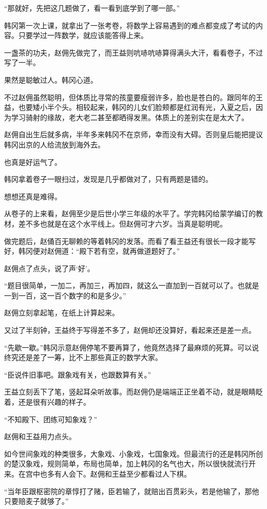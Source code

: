 “那就好，先把这几题做了，看一看到底学到了哪一部。”

韩冈第一次上课，就拿出了一张考卷，将数学上容易遇到的难点都变成了考试的内容。只要学过一阵数学，就应该能答得上来。

一盏茶的功夫，赵佣先做完了，而王益则吭哧吭哧算得满头大汗，看看卷子，不过写了一半。

果然是聪敏过人。韩冈心道。

不过赵佣虽然聪明，但体质比寻常的孩童要瘦弱许多，脸也是苍白的。跟同年的王益，也要矮小半个头。相较起来，韩冈的儿女们脸颊都是红润有光，入夏之后，因为学习骑射的缘故，老大老二甚至都晒得发黑。体质上的差别实在是太大了。

赵佣自出生后就多病，半年多来韩冈不在京师，幸而没有大碍。否则皇后能把提议韩冈出京的人给流放到海外去。

也真是好运气了。

韩冈拿着卷子一眼扫过，发现是几乎都做对了，只有两题是错的。

想想还真是难得。

从卷子的上来看，赵佣至少是后世小学三年级的水平了。学完韩冈给蒙学编订的教材，差不多也就是在这个水平线上。但赵佣可才六岁。当真是聪明呢。

做完题后，赵俑百无聊赖的等着韩冈的发落。而看了看王益还有很长一段才能写好，韩冈便对赵佣道：“殿下若有空，就再做道题好了。”

赵佣点了点头，说了声‘好’。

“题目很简单，一加二，再加三，再加四，就这么一直加到一百就可以了。也就是一到一百，这一百个数字的和是多少。”

赵佣立刻拿起笔，在纸上计算起来。

又过了半刻钟，王益终于写得差不多了，赵佣却还没算好，看起来还是差一点。

“先歇一歇。”韩冈示意赵佣停笔不要再算了，他竟然选择了最麻烦的死算。可以说终究还是差了一筹，比不上那些真正的数学大家。

“臣说件旧事吧。跟象戏有关，也跟数算有关。”

王益立刻丢下了笔，竖起耳朵听故事。而赵佣仍是端端正正坐着不动，就是眼睛眨着，还是很有兴趣的样子。

“不知殿下、团练可知象戏？”

赵佣和王益用力点头。

如今世间象戏的种类很多，大象戏、小象戏，七国象戏。但最流行的还是韩冈所创的楚汉象戏，规则简单，布局也简单，加上韩冈的名气也大，所以很快就流行开来。在宫中也多有人会下。赵佣和王益至少都看过人下棋。

“当年臣跟枢密院的章惇打了赌，臣若输了，就赔出百贯彩头，若是他输了，那他只要赔麦子就够了。”

